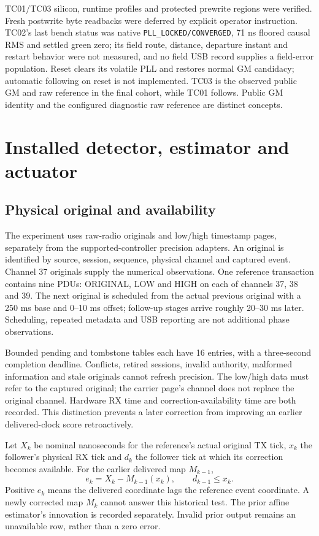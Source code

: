 \documentclass[11pt,letterpaper]{article}
\newcommand{\code}[1]{\texttt{\small #1}}
\begin{document}
TC01/TC03 silicon, runtime profiles and protected prewrite regions were verified. Fresh postwrite byte readbacks were deferred by explicit operator instruction. TC02's last bench status was native \code{PLL\_LOCKED/CONVERGED}, 71 ns floored causal RMS and settled green zero; its field route, distance, departure instant and restart behavior were not measured, and no field USB record supplies a field-error population. Reset clears its volatile PLL and restores normal GM candidacy; automatic following on reset is not implemented. TC03 is the observed public GM and raw reference in the final cohort, while TC01 follows. Public GM identity and the configured diagnostic raw reference are distinct concepts.

\section{Installed detector, estimator and actuator}
\subsection{Physical original and availability}
The experiment uses raw-radio originals and low/high timestamp pages, separately from the supported-controller precision adapters. An original is identified by source, session, sequence, physical channel and captured event. Channel 37 originals supply the numerical observations. One reference transaction contains nine PDUs: ORIGINAL, LOW and HIGH on each of channels 37, 38 and 39. The next original is scheduled from the actual previous original with a 250 ms base and 0--10 ms offset; follow-up stages arrive roughly 20--30 ms later. Scheduling, repeated metadata and USB reporting are not additional phase observations.

Bounded pending and tombstone tables each have 16 entries, with a three-second completion deadline. Conflicts, retired sessions, invalid authority, malformed information and stale originals cannot refresh precision. The low/high data must refer to the captured original; the carrier page's channel does not replace the original channel. Hardware RX time and correction-availability time are both recorded. This distinction prevents a later correction from improving an earlier delivered-clock score retroactively.

Let $X_k$ be nominal nanoseconds for the reference's actual original TX tick, $x_k$ the follower's physical RX tick and $d_k$ the follower tick at which its correction becomes available. For the earlier delivered map $M_{k-1}$,
\begin{equation}
 e_k=X_k-M_{k-1}(x_k),\qquad d_{k-1}\le x_k .\label{eq:causal}
\end{equation}
Positive $e_k$ means the delivered coordinate lags the reference event coordinate. A newly corrected map $M_k$ cannot answer this historical test. The prior affine estimator's innovation is recorded separately. Invalid prior output remains an unavailable row, rather than a zero error.
\end{document}
